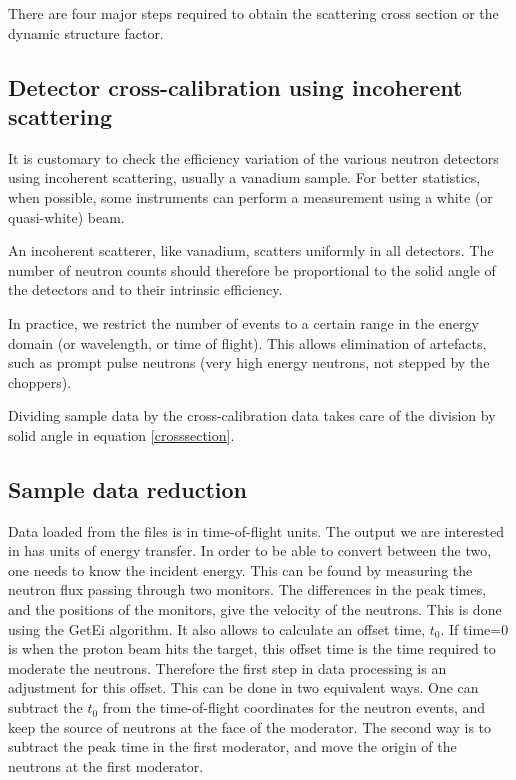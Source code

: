 There are four major steps required to obtain the scattering cross section or the dynamic structure factor.

\subsection{Detector cross-calibration using incoherent scattering}
It is customary to check the efficiency variation of the various neutron detectors using incoherent scattering, usually a vanadium sample. For better statistics, when possible, some instruments can perform a measurement using a white (or quasi-white) beam.

An incoherent scatterer, like vanadium, scatters uniformly in all detectors. The number of neutron counts should therefore be proportional to the solid angle of the detectors and to their intrinsic efficiency. 

In practice, we restrict the number of events to a certain range in the energy domain (or wavelength, or time of flight). This allows elimination of artefacts, such as prompt pulse neutrons (very high energy neutrons, not stepped by the choppers).

Dividing sample data by the cross-calibration data takes care of the division by solid angle in equation \ref{crosssection}. 


\subsection{Sample data reduction} 
Data loaded from the files is in time-of-flight units. The output we are interested in has units of energy transfer. In order to be able to convert between the two, one needs to know the incident energy. This can be found by measuring the neutron flux passing through two monitors. The differences in the peak times, and the positions of the monitors, give the velocity of the neutrons. This is done using the GetEi algorithm. It also allows to calculate an offset time, $t_0$. If time=0 is when the proton beam hits the target, this offset time is the time required to moderate the neutrons. Therefore the first step in data processing is an adjustment for this offset. This can be done in two equivalent ways. One can subtract the  $t_0$ from the time-of-flight coordinates for the neutron events, and keep the source of neutrons at the face of the moderator. The second way is to subtract the peak time in the first moderator, and move the origin of the neutrons at the first moderator.

